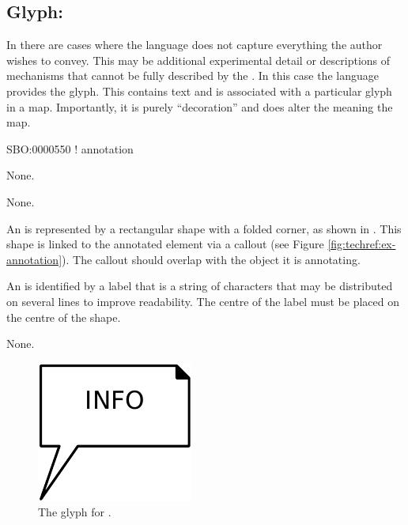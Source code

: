 \subsection{Glyph: }
\label{sec:annotation}

In \SBGNPDLone there are cases where the language does not capture everything the author wishes to convey.
This may be additional experimental detail or descriptions of mechanisms that cannot be fully described by the \PDl.
In this case the language provides the  glyph. This contains text and is associated with a particular glyph in a map.
Importantly, it is purely ``decoration'' and does alter the meaning the map.

\begin{glyphDescription}

\glyphSboTerm
SBO:0000550 ! annotation


\glyphIncoming
None.



\glyphOutgoing
None.


\glyphContainer
An  is represented by a rectangular shape with a folded corner, as shown in .
This shape is linked to the annotated element via a callout (see Figure \ref{fig:techref:ex-annotation}).
The callout should overlap with the object it is annotating.

\glyphLabel
An  is identified by a label that is  a string of characters that may be distributed on several lines to improve readability.
The centre of the label must be placed on the centre of the shape.

\glyphAux
None.

\end{glyphDescription}

\begin{figure}[htb]
  \centering
  \includegraphics{images/build/annotation.pdf}
  \caption{The \PD glyph for .}
  \label{fig:techref:annotation}
\end{figure}

